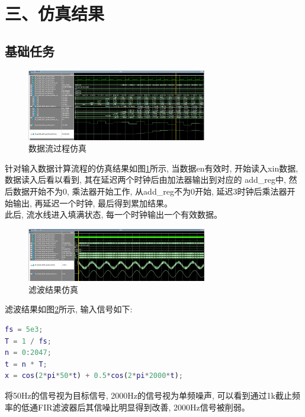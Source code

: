 \documentclass{article}
\newcommand{\fourhao}{\fontsize{14pt}{\baselineskip}\selectfont} %
\newcommand{\xiaosihao}{\fontsize{12pt}{\baselineskip}\selectfont} %
\begin{document}
\section*{\fourhao 三、仿真结果}
\xiaosihao
{}
\subsection*{基础任务}
\begin{figure}[htbp]
    \centering
    \includegraphics[width=0.7\textwidth]{image/2024-06-28-21-15-02.png}
    \caption{数据流过程仿真}
    \label{image_base_sim_1}
\end{figure}
针对输入数据计算流程的仿真结果如图\ref{image_base_sim_1}所示, 当数据en有效时, 
开始读入xin数据, 数据读入后看以看到, 其在延迟两个时钟后由加法器输出到对应的
add\_reg中, 然后数据开始不为0, 乘法器开始工作, 从add\_reg不为0开始, 延迟3时钟后乘法器开始输出, 再延迟一个时钟, 最后得到累加结果。\\
此后, 流水线进入填满状态, 每一个时钟输出一个有效数据。 
\begin{figure}[H]
    \centering
    \includegraphics[width=0.7\textwidth]{image/2024-06-28-21-13-57.png}
    \caption{滤波结果仿真}
    \label{image_base_sim_2}
\end{figure}
滤波结果如图\ref{image_base_sim_2}所示, 输入信号如下:
\begin{lstlisting}[language=Matlab]
fs = 5e3;
T = 1 / fs;
n = 0:2047;
t = n * T;
x = cos(2*pi*50*t) + 0.5*cos(2*pi*2000*t);
\end{lstlisting}
将50Hz的信号视为目标信号, 2000Hz的信号视为单频噪声, 可以看到通过1k截止频率的低通FIR滤波器后其信噪比明显得到改善, 2000Hz信号被削弱。
\end{document}

